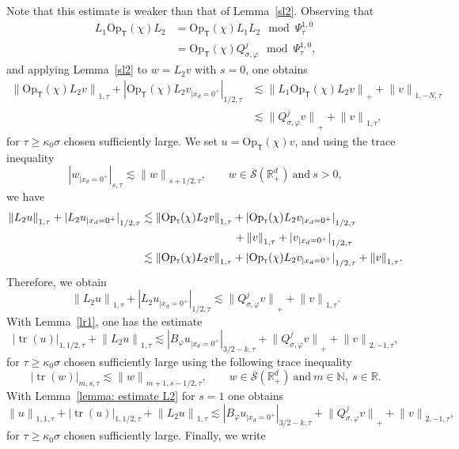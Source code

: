 \documentclass[JEP,XML,SOM,Unicode,published]{cedram}
\theoremstyle{plain}
\theoremstyle{definition}
\def\R{\mathbb{R}}
\def\N{\mathbb{N}}
\newcommand{\suff}{sufficiently\xspace}
\let\k\kappa
\newcommand{\br}{\ensuremath{_{|x_d=0^+}}}
\newcommand{\Opt}{\ensuremath{\mathrm{Op}_{\scriptscriptstyle{\mathsf{T}}}}}
\newcommand{\Norm}[2]{{\| #1 \|}_{#2}}
\newcommand{\Normsc}[2]{{\| #1 \|}_{#2, \tau}}
\newcommand{\normsc}[2]{{| #1 |}_{#2, \tau}}
\newcommand{\bignormsc}[2]{{\big| #1 \big|}_{#2, \tau}}
\newcommand{\Psisc}{\Psi_\tau}
\newcommand{\Qconj}{Q_{\sigma,\varphi}}
\newcommand{\Sbarp}{\ensuremath{\overline{\mathscr{S}}(\Rdp)}}
\newcommand{\Rdp}{\R^d_+}
\DeclareMathOperator{\trace}{tr}
\begin{document}
Note that this estimate is weaker than that of Lemma~\ref{sl2}.
Observing that
\begin{align*}
L_1 \Opt(\chi)L_2 &=\Opt(\chi)L_1 L_2 \mod \Psisc^{1,0}\\
&= \Opt(\chi)\Qconj^j \mod \Psisc^{1,0},
\end{align*}
and applying Lemma~\ref{sl2} to $w=L_2 v$ with $s=0$, one obtains
\begin{align*}
\Normsc{\Opt(\chi) L_2 v}{1}
+ \normsc{\Opt(\chi) L_2 v\br}{1/2}
& \lesssim \Norm{L_1 \Opt(\chi) L_2 v}{+}
+\Normsc{v}{1,-N}\\
& \lesssim \Norm{\Qconj^jv}{+}
+\Normsc{v}{1},
\end{align*}
for $\tau \geq \k_0 \sigma$ chosen \suff large.
We set $u=\Opt(\chi)v$, and using the trace inequality
\begin{equation*}
\normsc{w\br}{s}\lesssim \Normsc{w}{s+1/2},
\qquad w\in
\Sbarp \ \text{and} \ s>0,
\end{equation*}
we have
\begin{align*}
\Normsc{L_2 u}{1}+
\normsc{L_2 u\br}{1/2}
&\lesssim \Normsc{\Opt(\chi) L_2 v}{1}
+ \normsc{\Opt(\chi)L_2 v\br}{1/2}\\
&\hspace*{2.93cm} + \Normsc{v}{1} +\normsc{v\br}{1/2}\\
&\lesssim \Normsc{\Opt(\chi) L_2 v}{1} + \normsc{\Opt(\chi)L_2
v\br}{1/2} + \Normsc{v}{1}.
\end{align*}
Therefore, we obtain
\begin{equation*}
\Normsc{L_2 u}{1}+ \normsc{L_2 u\br}{1/2}
\lesssim \Norm{\Qconj^jv}{+}
+\Normsc{v}{1}.
\end{equation*}
With Lemma~\ref{lr1}, one has the estimate
\begin{equation*}
\bignormsc{\trace (u)}{1,1/2} + \Normsc{L_2 u}{1}
\lesssim
\normsc{B_{\varphi}u\br}{3/2-k}
+ \Norm{\Qconj^jv}{+}
+\Normsc{v}{2,-1},
\end{equation*}
for $\tau \geq \k_0 \sigma$ chosen \suff large
using the following trace inequality
\begin{equation*}
\normsc{\trace(w)}{m,s}
\lesssim \Normsc{w}{m+1,s-1/2},
\qquad w\in \Sbarp \ \text{and} \ m\in\N, \
s\in\R.
\end{equation*}
With Lemma~\ref{lemma: estimate L2} for $s=1$ one obtains
\[
\Normsc{u}{1,1} + \bignormsc{\trace (u)}{1,1/2} + \Normsc{L_2 u}{1}
\lesssim
\normsc{B_{\varphi}u\br}{3/2-k}
+ \Norm{\Qconj^jv}{+}
+\Normsc{v}{2,-1},
\]
for $\tau \geq \k_0 \sigma$ chosen \suff large.
Finally, we write
\end{document}
